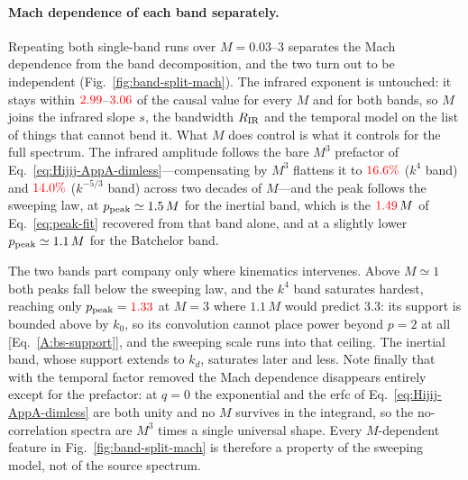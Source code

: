 \documentclass[10pt,prd,aps,nobibnotes,superscriptaddress,preprintnumbers,notitlepage]{revtex4-1}
\newcommand{\add}[1]{{\color{red}#1}}
\newcommand{\add}[1]{#1}
\begin{document}
\paragraph{Mach dependence of each band separately.}
Repeating both single-band runs over $M=0.03$--$3$ separates the Mach
dependence from the band decomposition, and the two turn out to be independent
(Fig.~\ref{fig:band-split-mach}). The infrared exponent is untouched: it stays
within $\add{2.99}$--$\add{3.06}$ of the causal value for every $M$ and for both bands, so
$M$ joins the infrared slope $s$, the bandwidth $R_{\rm IR}$ and the temporal
model on the list of things that cannot bend it. What $M$ does control is what
it controls for the full spectrum. The infrared amplitude follows the bare
$M^3$ prefactor of Eq.~\eqref{eq:Hijij-AppA-dimless}---compensating by $M^{3}$
flattens it to $\add{16.6\%}$ ($k^4$ band) and $\add{14.0\%}$ ($k^{-5/3}$ band) across two
decades of $M$---and the peak follows the sweeping law, at
$p_{\rm peak}\simeq1.5\,M$ for the inertial band, which is the
$\add{1.49}\,M$ of Eq.~\eqref{eq:peak-fit} recovered from that band alone, and at a
slightly lower $p_{\rm peak}\simeq1.1\,M$ for the Batchelor band.

The two bands part company only where kinematics intervenes. Above $M\simeq1$
both peaks fall below the sweeping law, and the $k^{4}$ band saturates hardest,
reaching only $p_{\rm peak}=\add{1.33}$ at $M=3$ where $1.1\,M$ would predict $3.3$:
its support is bounded above by $k_0$, so its convolution cannot place power
beyond $p=2$ at all [Eq.~\eqref{A:bs-support}], and the sweeping scale runs into
that ceiling. The inertial band, whose support extends to $k_d$, saturates later
and less. Note finally that with the temporal factor removed the Mach dependence
disappears entirely except for the prefactor: at $q=0$ the exponential and the
erfc of Eq.~\eqref{eq:Hijij-AppA-dimless} are both unity and no $M$ survives in
the integrand, so the no-correlation spectra are $M^{3}$ times a single
universal shape. Every $M$-dependent feature in Fig.~\ref{fig:band-split-mach}
is therefore a property of the sweeping model, not of the source spectrum.
\end{document}
